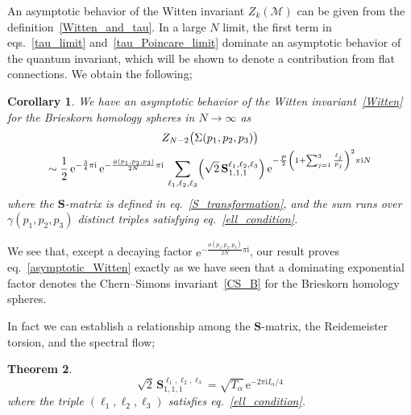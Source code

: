 \documentclass[12pt,reqno]{amsart}
\numberwithin{equation}{section}
\newtheorem{theorem}{Theorem}
\newtheorem{coro}[theorem]{Corollary}
\begin{document}
An asymptotic behavior of the Witten invariant $Z_k(\mathcal{M})$ can
be given from the definition~\eqref{Witten_and_tau}.
In  a large $N$ limit, the first term in eqs.~\eqref{tau_limit}
and~\eqref{tau_Poincare_limit}  dominate an asymptotic behavior of the
quantum invariant, which will be shown to denote a contribution from 
flat connections.
We obtain the following;
\begin{coro}
  We have an asymptotic behavior of the Witten invariant~\eqref{Witten}
  for the Brieskorn homology spheres in $N\to\infty$
  as
  \begin{multline}
    Z_{N-2}\bigl( \Sigma(p_1,p_2, p_3) \bigr)
    \\
    \sim
    \frac{1}{2} \, \mathrm{e}^{-\frac{3}{4} \pi \mathrm{i}} \,
    \mathrm{e}^{-\frac{\phi(p_1,p_2,p_3)}{2 N} \pi \mathrm{i}}
    \,
    \sum_{\ell_1, \ell_2, \ell_3}
    \Bigl(
    \sqrt{2} \, \mathbf{S}_{1,1,1}^{\ell_1, \ell_2, \ell_3}
    \Bigr) \,
    \mathrm{e}^{-\frac{P}{2}
      \left(
        1+ \sum_{j=1}^3 \frac{\ell_j}{p_j}
      \right)^2 
      \pi \mathrm{i} N
    }
  \end{multline}
  where the $\mathbf{S}$-matrix is defined in
  eq.~\eqref{S_transformation}, and the sum  runs over
  $\gamma(p_1,p_2,p_3)$ distinct triples satisfying eq.~\eqref{ell_condition}.
\end{coro}

We see that,
except a decaying  factor
$\mathrm{e}^{-\frac{\phi(p_1,p_2,p_3)}{2 N} \pi  \mathrm{i}}$,
our result proves eq.~\eqref{asymptotic_Witten} exactly
as we have seen that  a dominating
exponential factor denotes the Chern--Simons
invariant~\eqref{CS_B} for the Brieskorn homology spheres.

In fact
we can establish  a relationship 
among the $\mathbf{S}$-matrix, the
Reidemeister torsion, and the spectral flow;
\begin{theorem}
  \begin{equation}
    \label{S_and_torsion}
    \sqrt{2} \,
    \mathbf{S}_{1,1,1}^{\ell_1, \ell_2, \ell_3}
    =
    \sqrt{T_\alpha} \,
    \mathrm{e}^{-2 \pi \mathrm{i}  I_\alpha/4}
  \end{equation}
  where the triple $(\ell_1,\ell_2,\ell_3)$ satisfies eq.~\eqref{ell_condition}.
\end{theorem}
\end{document}
